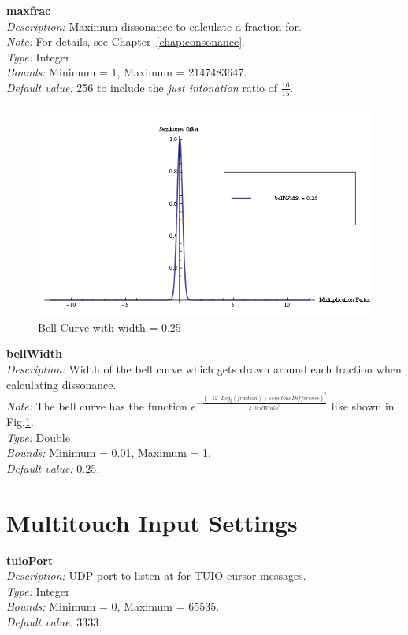 \documentclass[12pt,a4paper,titlepage,oneside]{report}
\begin{document}
\noindent
\textbf{maxfrac} \\
\emph{Description:} Maximum dissonance to calculate a fraction for. \\
\emph{Note:} For details, see Chapter~\ref{chap:consonance}. \\
\emph{Type:} Integer \\
\emph{Bounds:} Minimum = 1, Maximum = 2147483647. \\
\emph{Default value:} 256 to include the \emph{just intonation} ratio of $\frac{16}{15}$.

\begin{figure}[!ht]
\includegraphics[width=\textwidth]{images/bellcurve.png}
\centering
\caption{Bell Curve with width = 0.25}
\label{fig:bellcurve}
\end{figure}

\noindent
\textbf{bellWidth} \\
\emph{Description:} Width of the bell curve which gets drawn around each fraction when calculating dissonance. \\
\emph{Note:} The bell curve has the function $e^{- \frac{(- 12 \cdot Log_2(fraction) + semitoneDifference)^2}{2 \cdot bellWidth^2}}$ like shown in Fig.\ref{fig:bellcurve}. \\
\emph{Type:} Double \\
\emph{Bounds:} Minimum = 0.01, Maximum = 1. \\
\emph{Default value:} 0.25.


\section{Multitouch Input Settings}

\noindent
\textbf{tuioPort} \\
\emph{Description:} UDP port to listen at for TUIO cursor messages. \\
\emph{Type:} Integer \\
\emph{Bounds:} Minimum = 0, Maximum = 65535. \\
\emph{Default value:} 3333.
\end{document}
